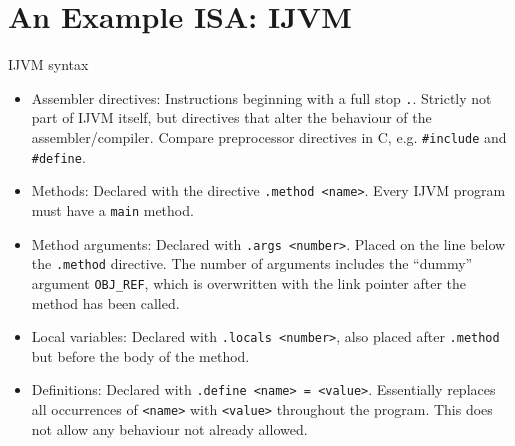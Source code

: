 \documentclass[article, a4paper, 11pt, oneside]{memoir}
\numberwithin{equation}{chapter}
\newcommand{\inlinecode}[1]{\colorbox{lightgray}{\vphantom{\texttt{jk}}\lstinline$#1$}}
\renewcommand{\inlinecode}{\lstinline}
\begin{document}
\section{An Example ISA: IJVM}

\begin{notelist}
\item[IJVM syntax]
~
%
\begin{itemize}
    \item Assembler directives: Instructions beginning with a full stop \inlinecode{.}. Strictly not part of IJVM itself, but directives that alter the behaviour of the assembler/compiler. Compare preprocessor directives in C, e.g. \inlinecode{#include} and \inlinecode{#define}.
    \item Methods: Declared with the directive \inlinecode{.method <name>}. Every IJVM program must have a \inlinecode{main} method.
    \item Method arguments: Declared with \inlinecode{.args <number>}. Placed on the line below the \inlinecode{.method} directive. The number of arguments includes the \enquote{dummy} argument \inlinecode{OBJ_REF}, which is overwritten with the link pointer after the method has been called.
    \item Local variables: Declared with \inlinecode{.locals <number>}, also placed after \inlinecode{.method} but before the body of the method.
    \item Definitions: Declared with \inlinecode{.define <name> = <value>}. Essentially replaces all occurrences of \inlinecode{<name>} with \inlinecode{<value>} throughout the program. This does not allow any behaviour not already allowed.
\end{itemize}


\end{notelist}
\end{document}
